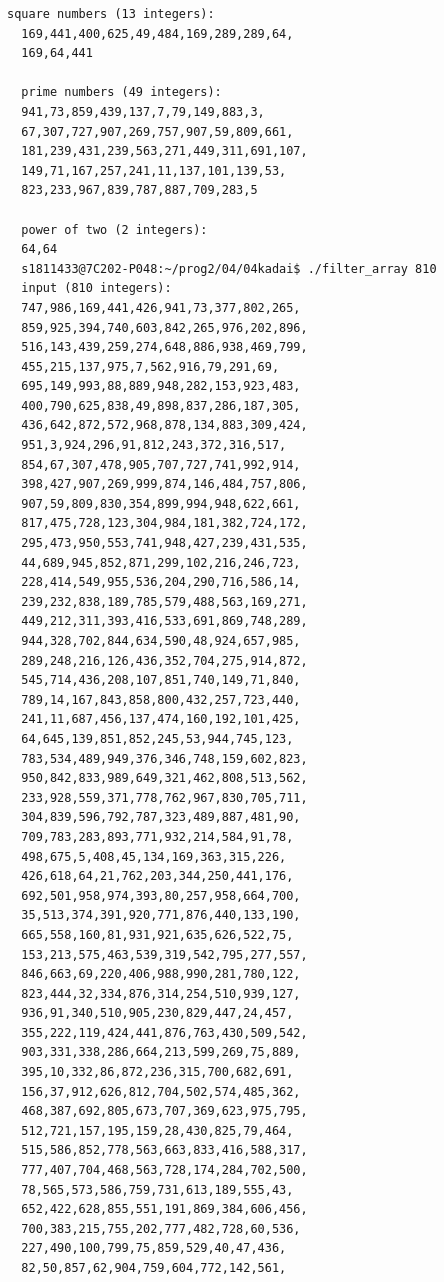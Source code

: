 \documentclass[10pt,a4paper]{jsarticle}
\begin{document}
\begin{lstlisting}[basicstyle=\ttfamily\footnotesize,frame=single]
  square numbers (13 integers):
  169,441,400,625,49,484,169,289,289,64,
  169,64,441

  prime numbers (49 integers):
  941,73,859,439,137,7,79,149,883,3,
  67,307,727,907,269,757,907,59,809,661,
  181,239,431,239,563,271,449,311,691,107,
  149,71,167,257,241,11,137,101,139,53,
  823,233,967,839,787,887,709,283,5

  power of two (2 integers):
  64,64
  s1811433@7C202-P048:~/prog2/04/04kadai$ ./filter_array 810
  input (810 integers):
  747,986,169,441,426,941,73,377,802,265,
  859,925,394,740,603,842,265,976,202,896,
  516,143,439,259,274,648,886,938,469,799,
  455,215,137,975,7,562,916,79,291,69,
  695,149,993,88,889,948,282,153,923,483,
  400,790,625,838,49,898,837,286,187,305,
  436,642,872,572,968,878,134,883,309,424,
  951,3,924,296,91,812,243,372,316,517,
  854,67,307,478,905,707,727,741,992,914,
  398,427,907,269,999,874,146,484,757,806,
  907,59,809,830,354,899,994,948,622,661,
  817,475,728,123,304,984,181,382,724,172,
  295,473,950,553,741,948,427,239,431,535,
  44,689,945,852,871,299,102,216,246,723,
  228,414,549,955,536,204,290,716,586,14,
  239,232,838,189,785,579,488,563,169,271,
  449,212,311,393,416,533,691,869,748,289,
  944,328,702,844,634,590,48,924,657,985,
  289,248,216,126,436,352,704,275,914,872,
  545,714,436,208,107,851,740,149,71,840,
  789,14,167,843,858,800,432,257,723,440,
  241,11,687,456,137,474,160,192,101,425,
  64,645,139,851,852,245,53,944,745,123,
  783,534,489,949,376,346,748,159,602,823,
  950,842,833,989,649,321,462,808,513,562,
  233,928,559,371,778,762,967,830,705,711,
  304,839,596,792,787,323,489,887,481,90,
  709,783,283,893,771,932,214,584,91,78,
  498,675,5,408,45,134,169,363,315,226,
  426,618,64,21,762,203,344,250,441,176,
  692,501,958,974,393,80,257,958,664,700,
  35,513,374,391,920,771,876,440,133,190,
  665,558,160,81,931,921,635,626,522,75,
  153,213,575,463,539,319,542,795,277,557,
  846,663,69,220,406,988,990,281,780,122,
  823,444,32,334,876,314,254,510,939,127,
  936,91,340,510,905,230,829,447,24,457,
  355,222,119,424,441,876,763,430,509,542,
  903,331,338,286,664,213,599,269,75,889,
  395,10,332,86,872,236,315,700,682,691,
  156,37,912,626,812,704,502,574,485,362,
  468,387,692,805,673,707,369,623,975,795,
  512,721,157,195,159,28,430,825,79,464,
  515,586,852,778,563,663,833,416,588,317,
  777,407,704,468,563,728,174,284,702,500,
  78,565,573,586,759,731,613,189,555,43,
  652,422,628,855,551,191,869,384,606,456,
  700,383,215,755,202,777,482,728,60,536,
  227,490,100,799,75,859,529,40,47,436,
  82,50,857,62,904,759,604,772,142,561,

\end{lstlisting}
\end{document}
